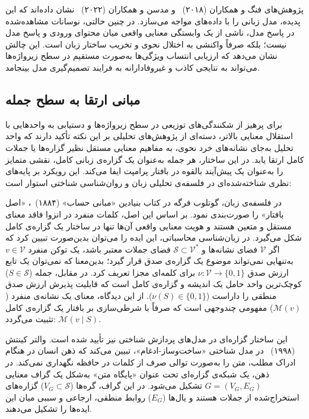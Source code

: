 پژوهش‌های فنگ و همکاران (۲۰۱۸)~\cite{feng2018pathologies} و مدسن و همکاران (۲۰۲۲)~\cite{madsen2022evaluating} نشان داده‌اند که این پدیده، مدل زبانی را با داده‌های  مواجه می‌سازد. در چنین حالتی، نوسانات مشاهده‌شده در پاسخ مدل، ناشی از یک وابستگی معنایی واقعی میان محتوای ورودی و پاسخ مدل نیست؛ بلکه صرفاً واکنشی به اختلال نحوی و تخریب ساختار زبان است. این چالش نشان می‌دهد که ارزیابی انتساب ویژگی‌ها به‌صورت مستقیم در سطح زیرواژه‌ها می‌تواند به نتایجی کاذب و غیروفادارانه به فرایند تصمیم‌گیری مدل بینجامد.


\subsection{مبانی ارتقا به سطح جمله}\label{sec:2-3-3}

برای پرهیز از شکنندگی‌های توزیعی در سطح زیرواژه‌ها و دستیابی به واحدهایی با استقلال معنایی بالاتر، دسته‌ای از پژوهش‌های تحلیلی بر این نکته تأکید دارند که واحد تحلیل به‌جای نشانه‌های خرد نحوی، به مفاهیم معنایی مستقل نظیر گزاره‌ها یا جملات کامل ارتقا یابد. در این ساختار، هر جمله به‌عنوان یک گزاره‌ی زبانی کامل، نقشی متمایز را به‌عنوان یک پیش‌آیند بالقوه در بافتار پرامپت ایفا می‌کند. این رویکرد بر پایه‌های نظری شناخته‌شده‌ای در فلسفه‌ی تحلیلی زبان و روان‌شناسی شناختی استوار است:

در فلسفه‌ی زبان، گوتلوب فرگه در کتاب بنیادین «مبانی حساب» (۱۸۸۴)~\cite{frege1991foundations}، «اصل بافتار» را صورت‌بندی نمود. بر اساس این اصل، کلمات منفرد در انزوا فاقد معنای مستقل و متعین هستند و هویت معنایی واقعی آن‌ها تنها در ساختار یک گزاره‌ی کامل شکل می‌گیرد. در زبان‌شناسی محاسباتی، این ایده را می‌توان بدین‌صورت تبیین کرد که اگر $\mathcal{V}$ فضای نشانه‌ها و $\mathcal{S} \subset \mathcal{V}^*$ فضای جملات معتبر باشد، یک توکن منفرد $v \in \mathcal{V}$ به‌تنهایی نمی‌تواند موضوع یک گزاره‌ی صدق قرار گیرد؛ بدین‌معنا که نمی‌توان یک تابع ارزش صدق $\nu: \mathcal{V} \to \{0, 1\}$ برای کلمه‌ای مجزا تعریف کرد. در مقابل، جمله ($S \in \mathcal{S}$) کوچک‌ترین واحد حامل یک اندیشه و گزاره‌ی کامل است که قابلیت پذیرش ارزش صدق منطقی را داراست ($\nu(S) \in \{0, 1\}$). از این دیدگاه، معنای یک نشانه‌ی منفرد ($\mathcal{M}(v)$) مفهومی چندوجهی است که صرفاً با شرطی‌سازی بر بافتار یک گزاره‌ی کامل تثبیت می‌گردد: $\mathcal{M}(v \mid S)$.

این ساختار گزاره‌ای در مدل‌های پردازش شناختی نیز تأیید شده است. والتر کینتش (۱۹۹۸)~\cite{kintsch1998comprehension} در مدل شناختی «ساخت‌وساز-ادغام»، تبیین می‌کند که ذهن انسان در هنگام ادراک مطلب، متن را به‌صورت توالی صرف از کلمات در حافظه نگهداری نمی‌کند. در ذهن، یک شبکه‌ی گزاره‌ای تحت عنوان «پایگاه متن» به‌شکل یک گراف معنایی $G = (V_G, E_G)$ تشکیل می‌شود. در این گراف، گره‌ها ($V_G \subset \mathcal{S}$) گزاره‌های استخراج‌شده از جملات هستند و یال‌ها ($E_G$) روابط منطقی، ارجاعی و سببی میان این ایده‌ها را تشکیل می‌دهند.

